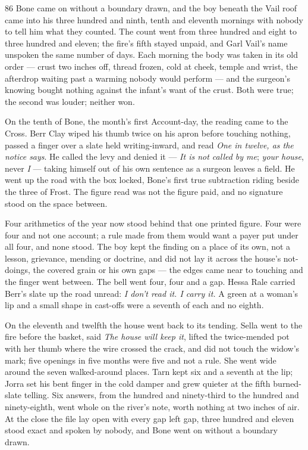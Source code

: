 \begin{CRchronicle}{86}
Bone came on without a boundary drawn, and the boy beneath the Vail roof came into his three hundred and ninth, tenth and eleventh mornings with nobody to tell him what they counted. The count went from three hundred and eight to three hundred and eleven; the fire’s fifth stayed unpaid, and Garl Vail’s name unspoken the same number of days. Each morning the body was taken in its old order --- crust two inches off, thread frozen, cold at cheek, temple and wrist, the afterdrop waiting past a warming nobody would perform --- and the surgeon’s knowing bought nothing against the infant’s want of the crust. Both were true; the second was louder; neither won.

On the tenth of Bone, the month’s first Account-day, the reading came to the Cross. Berr Clay wiped his thumb twice on his apron before touching nothing, passed a finger over a slate held writing-inward, and read \emph{One in twelve, as the notice says}. He called the levy and denied it --- \emph{It is not called by me}; \emph{your house}, never \emph{I} --- taking himself out of his own sentence as a surgeon leaves a field. He went up the road with the box locked, Bone’s first true subtraction riding beside the three of Frost. The figure read was not the figure paid, and no signature stood on the space between.

Four arithmetics of the year now stood behind that one printed figure. Four were four and not one account; a rule made from them would want a payer put under all four, and none stood. The boy kept the finding on a place of its own, not a lesson, grievance, mending or doctrine, and did not lay it across the house’s not-doings, the covered grain or his own gaps --- the edges came near to touching and the finger went between. The bell went four, four and a gap. Hessa Rale carried Berr’s slate up the road unread: \emph{I don’t read it. I carry it.} A green at a woman’s lip and a small shape in cast-offs were a seventh of each and no eighth.

On the eleventh and twelfth the house went back to its tending. Sella went to the fire before the basket, said \emph{The house will keep it}, lifted the twice-mended pot with her thumb where the wire crossed the crack, and did not touch the widow’s mark; five openings in five months were five and not a rule. She went wide around the seven walked-around places. Tarn kept six and a seventh at the lip; Jorra set his bent finger in the cold damper and grew quieter at the fifth burned-slate telling. Six answers, from the hundred and ninety-third to the hundred and ninety-eighth, went whole on the river’s note, worth nothing at two inches of air. At the close the file lay open with every gap left gap, three hundred and eleven stood exact and spoken by nobody, and Bone went on without a boundary drawn.
\end{CRchronicle}
